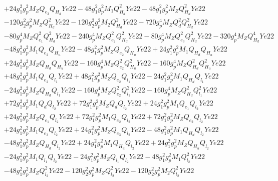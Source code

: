 \begin{align}
 &+24 g_{1}^{2} g_{p}^{2} M_Z Q_{e_3} Q_{H_d} Ye22 -48 g_{1}^{2} g_{p}^{2} M_1 Q_{H_d}^{2} Ye22 -48 g_{1}^{2} g_{p}^{2} M_Z Q_{H_d}^{2} Ye22 \nonumber \\ 
 &-120 g_{2}^{2} g_{p}^{2} M_Z Q_{H_d}^{2} Ye22 -120 g_{2}^{2} g_{p}^{2} M_2 Q_{H_d}^{2} Ye22 -720 g_{p}^{4} M_Z Q_{d}^{2} Q_{H_d}^{2} Ye22 \nonumber \\ 
 &-80 g_{p}^{4} M_Z Q_{e_{1}}^{2} Q_{H_d}^{2} Ye22 -240 g_{p}^{4} M_Z Q_{e_{2}}^{2} Q_{H_d}^{2} Ye22 -80 g_{p}^{4} M_Z Q_{e_3}^{2} Q_{H_d}^{2} Ye22 -320 g_{p}^{4} M_Z Q_{H_d}^{4} Ye22 \nonumber \\ 
 &-48 g_{1}^{2} g_{p}^{2} M_1 Q_{e_{2}} Q_{H_u} Ye22 -48 g_{1}^{2} g_{p}^{2} M_Z Q_{e_{2}} Q_{H_u} Ye22 +24 g_{1}^{2} g_{p}^{2} M_1 Q_{H_d} Q_{H_u} Ye22 \nonumber \\ 
 &+24 g_{1}^{2} g_{p}^{2} M_Z Q_{H_d} Q_{H_u} Ye22 -160 g_{p}^{4} M_Z Q_{e_{2}}^{2} Q_{H_u}^{2} Ye22 -160 g_{p}^{4} M_Z Q_{H_d}^{2} Q_{H_u}^{2} Ye22 \nonumber \\ 
 &+48 g_{1}^{2} g_{p}^{2} M_1 Q_{e_{2}} Q_{l_1} Ye22 +48 g_{1}^{2} g_{p}^{2} M_Z Q_{e_{2}} Q_{l_1} Ye22 -24 g_{1}^{2} g_{p}^{2} M_1 Q_{H_d} Q_{l_1} Ye22 \nonumber \\ 
 &-24 g_{1}^{2} g_{p}^{2} M_Z Q_{H_d} Q_{l_1} Ye22 -160 g_{p}^{4} M_Z Q_{e_{2}}^{2} Q_{l_1}^{2} Ye22 -160 g_{p}^{4} M_Z Q_{H_d}^{2} Q_{l_1}^{2} Ye22 \nonumber \\ 
 &+72 g_{1}^{2} g_{p}^{2} M_1 Q_{d} Q_{l_2} Ye22 +72 g_{1}^{2} g_{p}^{2} M_Z Q_{d} Q_{l_2} Ye22 +24 g_{1}^{2} g_{p}^{2} M_1 Q_{e_{1}} Q_{l_2} Ye22 \nonumber \\ 
 &+24 g_{1}^{2} g_{p}^{2} M_Z Q_{e_{1}} Q_{l_2} Ye22 +72 g_{1}^{2} g_{p}^{2} M_1 Q_{e_{2}} Q_{l_2} Ye22 +72 g_{1}^{2} g_{p}^{2} M_Z Q_{e_{2}} Q_{l_2} Ye22 \nonumber \\ 
 &+24 g_{1}^{2} g_{p}^{2} M_1 Q_{e_3} Q_{l_2} Ye22 +24 g_{1}^{2} g_{p}^{2} M_Z Q_{e_3} Q_{l_2} Ye22 -48 g_{1}^{2} g_{p}^{2} M_1 Q_{H_d} Q_{l_2} Ye22 \nonumber \\ 
 &-48 g_{1}^{2} g_{p}^{2} M_Z Q_{H_d} Q_{l_2} Ye22 +24 g_{1}^{2} g_{p}^{2} M_1 Q_{H_u} Q_{l_2} Ye22 +24 g_{1}^{2} g_{p}^{2} M_Z Q_{H_u} Q_{l_2} Ye22 \nonumber \\ 
 &-24 g_{1}^{2} g_{p}^{2} M_1 Q_{l_1} Q_{l_2} Ye22 -24 g_{1}^{2} g_{p}^{2} M_Z Q_{l_1} Q_{l_2} Ye22 -48 g_{1}^{2} g_{p}^{2} M_1 Q_{l_2}^{2} Ye22 \nonumber \\ 
 &-48 g_{1}^{2} g_{p}^{2} M_Z Q_{l_2}^{2} Ye22 -120 g_{2}^{2} g_{p}^{2} M_Z Q_{l_2}^{2} Ye22 -120 g_{2}^{2} g_{p}^{2} M_2 Q_{l_2}^{2} Ye22 \nonumber \\ 

\end{align}
